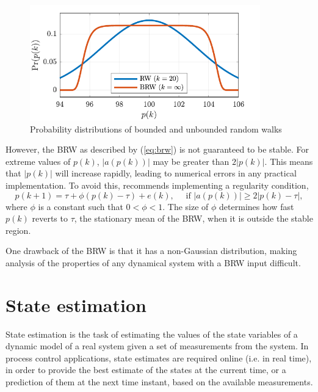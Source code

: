 
\begin{figure}[htp]
	\centering
	\includegraphics[height=5cm]{images/brw_pdf.pdf}
	\caption{Probability distributions of bounded and unbounded random walks}
	\label{fig:brw-pdf}
\end{figure}

However, the BRW as described by (\ref{eq:brw}) is not guaranteed to be stable.  For extreme values of $p(k)$, $|a(p(k))|$ may be greater than $2|p(k)|$.  This means that $|p(k)|$ will increase rapidly, leading to numerical errors in any practical implementation.  To avoid this, \cite{nicolau_stationary_2002} recommends implementing a regularity condition,
\begin{equation} \label{eq:brw-reg}
	p(k+1) = \tau + \phi(p(k) - \tau) + e(k), \quad \text { if }\left|a(p(k))\right| \geq 2\left|p(k)-\tau\right|,
\end{equation}
where $\phi$ is a constant such that $0<\phi<1$. The size of $\phi$ determines how fast $p(k)$ reverts to $\tau$, the stationary mean of the BRW, when it is outside the stable region.

One drawback of the BRW is that it has a non-Gaussian distribution, making analysis of the properties of any dynamical system with a BRW input difficult.

\section{State estimation}

State estimation is the task of estimating the values of the state variables of a dynamic model of a real system given a set of measurements from the system. In process control applications, state estimates are required online (i.e. in real time), in order to provide the best estimate of the states at the current time, or a prediction of them at the next time instant, based on the available measurements.

